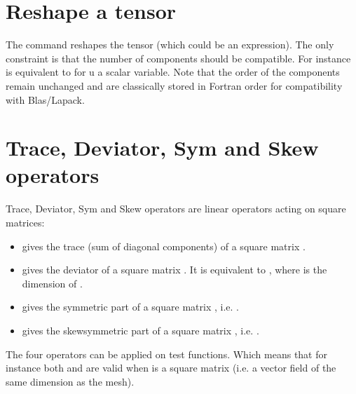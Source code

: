 \documentclass[a4paper,11pt,english]{sphinxmanual}
\begin{document}
\section{Reshape a tensor}
\label{\detokenize{userdoc/gasm_high:reshape-a-tensor}}
The command  reshapes the tensor  (which could be an expression). The only constraint is that the number of components should be compatible. For instance   is equivalent to  for u a scalar variable. Note that the order of the components remain unchanged and are classically stored in Fortran order for compatibility with Blas/Lapack.


\section{Trace, Deviator, Sym and Skew operators}
\label{\detokenize{userdoc/gasm_high:trace-deviator-sym-and-skew-operators}}
Trace, Deviator, Sym and Skew operators are linear operators acting on square matrices:
\begin{itemize}
\item {} 
 gives the trace (sum of diagonal components) of a square matrix .

\item {} 
 gives the deviator of a square matrix . It is equivalent to , where  is the dimension of .

\item {} 
 gives the symmetric part of a square matrix , i.e. .

\item {} 
 gives the skew\sphinxhyphen{}symmetric part of a square matrix , i.e. .

\end{itemize}

The four operators can be applied on test functions. Which means that for instance both  and   are valid when  is a square matrix (i.e.  a vector field of the same dimension as the mesh).
\end{document}
